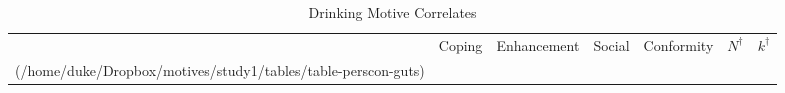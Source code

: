%
\begin{table*}\centering
\caption{Drinking Motive Correlates}
\label{tab:personcor}
\ifapamodeman{\hspace*{-2em}}{\vspace*{3mm}}
\footnotesize
\begin{tabular}{l c c c c c c}
\firsthline
\noalign{\smallskip}
\multicolumn{1}{l}{{Construct}} & 
\multicolumn{1}{c}{{Coping}} & 
\multicolumn{1}{c}{{Enhancement}} & 
\multicolumn{1}{c}{{Social}} & 
\multicolumn{1}{c}{{Conformity}} & 
$N^{\dagger}$ & $k^{\dagger}$\\
\noalign{\smallskip}
\hline
\noalign{\smallskip}
(/home/duke/Dropbox/motives/study1/tables/table-perscon-guts)

\end{tabular}
\end{table*}
